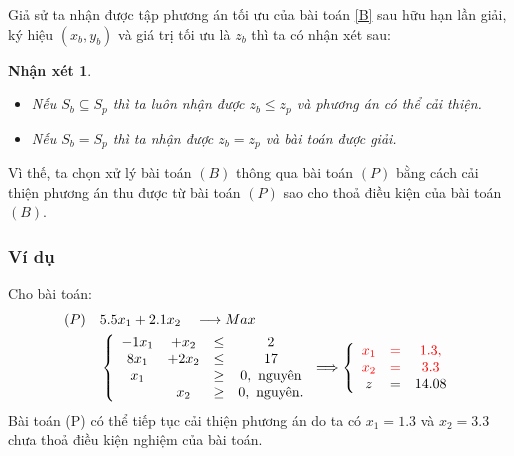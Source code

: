 \documentclass[12pt,a4paper]{report}
\newtheorem{nx}{Nhận xét}
\begin{document}
Giả sử ta nhận được tập phương án tối ưu của bài toán \eqref{B} sau hữu hạn lần giải, ký hiệu $(x_b, y_b)$ và giá trị tối ưu là $z_b$ thì ta có nhận xét sau:
\begin{nx} \label{nx}
\phantom{abc}
\begin{itemize}
\item Nếu $S_b \subseteq S_p$ thì ta luôn nhận được $z_b \leq z_p$ và phương án có thể cải thiện.
\item Nếu $S_b = S_p$ thì ta nhận được $z_b = z_p$ và bài toán được giải.
\end{itemize}    
\end{nx}
Vì thế, ta chọn xử lý bài toán $(B)$ thông qua bài toán $(P)$ bằng cách cải thiện phương án thu được từ bài toán $(P)$ sao cho thoả điều kiện của bài toán $(B)$.

\subsubsection*{Ví dụ}
Cho bài toán:
        \begin{equation}
        \begin{split}
            (P) \quad & 5.5x_1 + 2.1x_2 \quad \longrightarrow Max \\
            & \left\{\begin{array} {cccc}
            -1x_1 &+ x_2 &\leq& 2 \\
            8x_1 &+ 2x_2 &\leq& 17 \\
            x_1 &&\geq & 0, \text{ nguyên} \\
            &x_2 &\geq& 0, \text{ nguyên}. \\
            \end{array}\right.
            \Longrightarrow
            \left\{\begin{array} {ccc}
            \color{red} x_1 & \color{red}=& \color{red}1.3, \\
            \color{red} x_2 &\color{red} =& \color{red}3.3 \\
            z &=&14.08
        \end{array}\right.
        \end{split}
        \end{equation}
    Bài toán (P) có thể tiếp tục cải thiện phương án do ta có $x_1=1.3$ và $x_2=3.3$ chưa thoả điều kiện nghiệm của bài toán.
\end{document}
